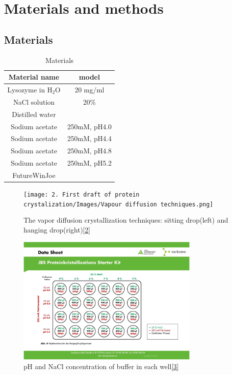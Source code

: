 \documentclass[a4paper,english,12pt,bibliography=totoc]{scrreprt}
\begin{document}
\chapter{Materials and methods}

\section{Materials}

\begin{table}[h]
\centering
\begin{tabular}{|c|c|}
  \hline
  Material name & model \\
  \hline
  Lysozyme in \(\mathrm{H_2O }\) & 20 mg/ml \\
    \hline
  NaCl solution & 20\%  \\
    \hline
  Distilled water &  \\
    \hline
Sodium acetate & 250mM, pH4.0\\
  \hline
  Sodium acetate & 250mM, pH4.4\\
  \hline
  Sodium acetate & 250mM, pH4.8\\
  \hline
  Sodium acetate & 250mM, pH5.2\\
  \hline
  FutureWinJoe & \\
  \hline
\end{tabular}
\caption{Materials}
\label{tab:material}
\end{table}

\begin{figure}[H]
        \centering
        \texttt{[image: 2. First draft of protein crystalization/Images/Vapour diffusion techniques.png]}
	    \caption{The vapor diffusion crystallization techniques: sitting drop(left) and hanging drop(right)\hyperref[sec:ref_2]{[2]}}
\end{figure}

\begin{figure}[H]
        \centering
        \includegraphics[width=0.8\textwidth]{wells}
	    \caption{pH and NaCl concentration of buffer in each well\hyperref[sec:ref_3]{[3]}}
\end{figure}
\end{document}
